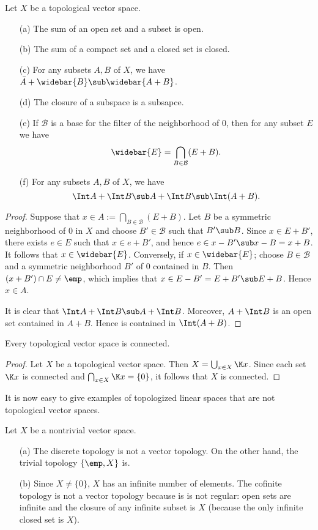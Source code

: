 \begin{proposition}\label{TVS interior and closure}
Let $X$ be a topological vector space.
\begin{itemize}
\item[(a)] The sum of an open set and a subset is open.
\item[(b)] The sum of a compact set and a closed set is closed.
\item[(c)] For any subsets $A,B$ of $X$, we have $\bar{A}+\widebar{B}\sub\widebar{A+B}$.
\item[(d)] The closure of a subspace is a subsapce.
\item[(e)] If $\mathcal{B}$ is a base for the filter of the neighborhood of $0$, then for any subset $E$ we have
\[\widebar{E}=\bigcap_{B\in\mathcal{B}}(E+B).\]
\item[(f)] For any subsets $A,B$ of $X$, we have
\[\Int A+\Int B\sub A+\Int B\sub\Int(A+B).\] 
\end{itemize}
\end{proposition}
\begin{proof}
Suppose that $x\in A:=\bigcap_{B\in\mathcal{B}}(E+B)$. Let $B$ be a symmetric neighborhood of $0$ in $X$ and choose $B'\in\mathcal{B}$ such that $B'\sub B$. Since $x\in E+B'$, there exists $e\in E$ such that $x\in e+B'$, and hence $e\in x-B'\sub x-B=x+B$. It follows that $x\in\widebar{E}$. Conversely, if $x\in\widebar{E}$; choose $B\in\mathcal{B}$ and a symmetric neighborhood $B'$ of $0$ contained in $B$. Then $(x+B')\cap E\neq\emp$, which implies that $x\in E-B'=E+B'\sub E+B$. Hence $x\in A$.\par
It is clear that $\Int A+\Int B\sub A+\Int B$. Moreover, $A+\Int B$ is an open set contained in $A+B$. Hence is contained in $\Int(A+B)$.
\end{proof}
\begin{proposition}
Every topological vector space is connected.
\end{proposition}
\begin{proof}
Let $X$ be a topological vector space. Then $X=\bigcup_{x\in X}\K x$. Since each set $\K x$ is connected and $\bigcap_{x\in X}\K x=\{0\}$, it follows that $X$ is connected.
\end{proof}
It is now easy to give examples of topologized linear spaces that are not topological vector spaces.
\begin{example}
Let $X$ be a nontrivial vector space.
\begin{itemize}
\item[(a)] The discrete topology is not a vector topology. On the other hand, the trivial topology $\{\emp,X\}$ is.
\item[(b)] Since $X\neq\{0\}$, $X$ has an infinite number of elements. The cofinite topology is not a vector topology because is is not regular: open sets are infinite and the closure of any infinite subset is $X$ (because the only infinite closed set is $X$).
\end{itemize}
\end{example}
